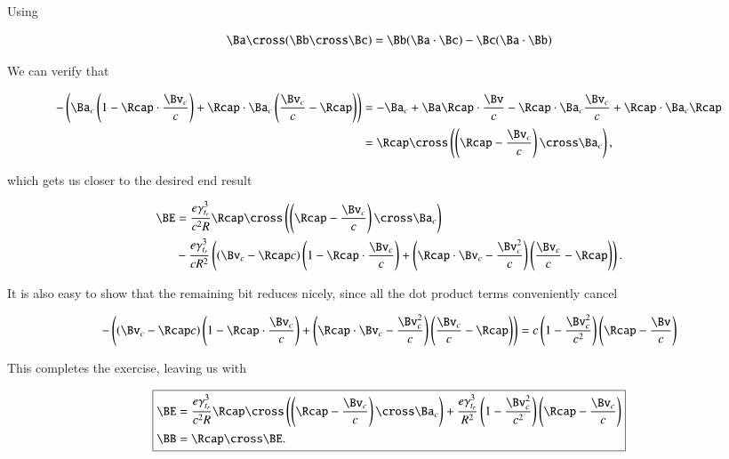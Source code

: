 Using

\begin{equation}\label{eqn:relElectroDynProblemSet5:510}
\Ba \cross (\Bb \cross \Bc) = \Bb (\Ba \cdot \Bc) - \Bc (\Ba \cdot \Bb)
\end{equation}

We can verify that

\begin{align*}
- \left( 
\Ba_c
\left(
1 -\Rcap \cdot \frac{\Bv_c}{c} 
\right)
+\Rcap \cdot \Ba_c \left( \frac{\Bv_c}{c} - \Rcap \right)
\right) 
&=
-\Ba_c + \Ba \Rcap \cdot \frac{\Bv}{c} - \Rcap \cdot \Ba_c \frac{\Bv_c}{c} + \Rcap \cdot \Ba_c \Rcap \\
&= \Rcap \cross \left( \left(\Rcap - \frac{\Bv_c}{c} \right) \cross \Ba_c \right),
\end{align*}

which gets us closer to the desired end result

\begin{equation}\label{eqn:relElectroDynProblemSet5:530}
\begin{aligned}
\BE
&= 
\frac{e \gamma_{t_r}^3}{c^2 R} \Rcap \cross \left( \left(\Rcap - \frac{\Bv_c}{c} \right) \cross \Ba_c \right) \\
&- \frac{e \gamma_{t_r}^3}{c R^2} \left( 
\left(
\Bv_c
- \Rcap c
\right) 
\left(
1 -\Rcap \cdot \frac{\Bv_c}{c} 
\right)
+ \left( \Rcap \cdot \Bv_c - \frac{\Bv_c^2}{c} \right)
\left( \frac{\Bv_c}{c} - \Rcap \right)
\right).
\end{aligned}
\end{equation}

It is also easy to show that the remaining bit reduces nicely, since all the dot product terms conveniently cancel

\begin{equation}\label{eqn:relElectroDynProblemSet5:550}
- \left( 
\left(
\Bv_c
- \Rcap c
\right) 
\left(
1 -\Rcap \cdot \frac{\Bv_c}{c} 
\right)
+ \left( \Rcap \cdot \Bv_c - \frac{\Bv_c^2}{c} \right)
\left( \frac{\Bv_c}{c} - \Rcap \right)
\right) 
= 
c 
\left( 1 - \frac{\Bv_c^2}{c^2} \right) 
\left( \Rcap - \frac{\Bv}{c} \right)
\end{equation}

This completes the exercise, leaving us with

\begin{equation}\label{eqn:relElectroDynProblemSet5:570}
\boxed{
\begin{aligned}
\BE
&= 
\frac{e \gamma_{t_r}^3}{c^2 R} \Rcap \cross \left( \left(\Rcap - \frac{\Bv_c}{c} \right) \cross \Ba_c \right)
+\frac{e \gamma_{t_r}^3}{R^2} 
\left( 1 - \frac{\Bv_c^2}{c^2} \right) 
\left( \Rcap - \frac{\Bv_c}{c} \right) \\
\BB &= \Rcap \cross \BE.
\end{aligned}
}
\end{equation}

